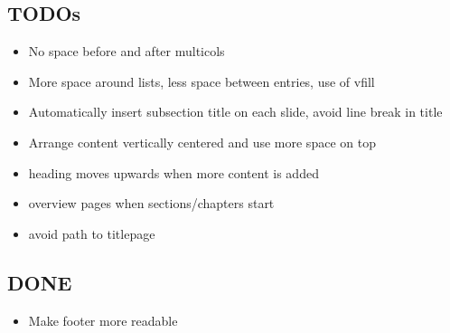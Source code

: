 \subsection{TODOs}
\begin{frame}{\insertsubsection}
	\begin{itemize}
		\item No space before and after multicols
		\item More space around lists, less space between entries, use of vfill
		\item Automatically insert subsection title on each slide, avoid line break in title
		\item Arrange content vertically centered and use more space on top
		\item heading moves upwards when more content is added
		\item overview pages when sections/chapters start
		\item avoid path to titlepage
	\end{itemize}
\end{frame}

\subsection{DONE}
\begin{frame}{\insertsubsection}
	\begin{itemize}
		\item Make footer more readable
	\end{itemize}
\end{frame}



